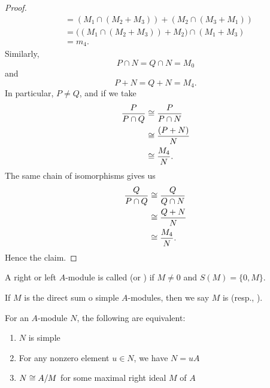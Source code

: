 \begin{proof}
\begin{subequations}
\begin{align}
&=(M_{1}\cap(M_{2}+M_{3}))+(M_{2}\cap(M_{3}+M_{1}))\\
&=\bigl((M_{1}\cap(M_{2}+M_{3}))+M_{2}\bigr)\cap(M_{1}+M_{3})\\
&=m_{4}.
  \end{align}
\end{subequations}
Similarly,
\begin{equation}
P\cap N=Q\cap N=M_{0}
\end{equation}
and
\begin{equation}
P+N=Q+N=M_{4}.
\end{equation}
In particular, $P\neq Q$, and if we take
\begin{subequations}
  \begin{align}
\frac{P}{P\cap Q} &\cong\frac{P}{P\cap N}\\
&\cong\frac{(P+N)}{N}\\
&\cong\frac{M_{4}}{N}.
  \end{align}
\end{subequations}
The same chain of isomorphisms gives us
\begin{subequations}
  \begin{align}
\frac{Q}{P\cap Q}&\cong\frac{Q}{Q\cap N}\\
&\cong\frac{Q+N}{N}\\
&\cong\frac{M_{4}}{N}.
  \end{align}
\end{subequations}
Hence the claim.
\end{proof}

\begin{definition}
A right or left $A$-module is called  (or
) if $M\neq0$ and $S(M)=\{0,M\}$.

If $M$ is the direct sum o simple $A$-modules, then we say $M$ is
 (resp., ).
\end{definition}

\begin{proposition}\label{prop:2.10}
For an $A$-module $N$, the following are equivalent:
\begin{enumerate}
\item $N$ is simple
\item For any nonzero element $u\in N$, we have $N=uA$
\item $N\cong A/M$ for some maximal right ideal $M$ of $A$
\end{enumerate}
\end{proposition}

